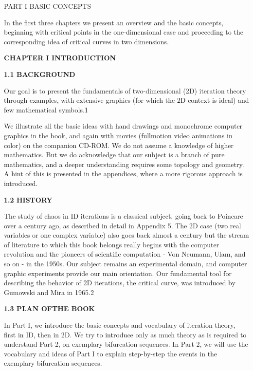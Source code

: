 \documentclass[12pt]{article}
\begin{document}
PART I
BASIC
CONCEPTS

\hfill

In the first three chapters we present an overview
and the basic concepts, beginning with critical
points in the one-dimensional case and proceeding
to the corresponding idea of critical curves in two
dimensions.

\hfill

\textbf{CHAPTER I
INTRODUCTION}

\hfill

\textbf{1.1 BACKGROUND}

\hfill

Our goal is to present the fundamentals of two-dimensional
(2D) iteration theory through examples, with extensive graphics
(for which the 2D context is ideal) and few mathematical symbols.1

\hfill

We illustrate all the basic ideas with hand drawings and monochrome
computer graphics in the book, and again with movies (fullmotion
video animations in color) on the companion CD-ROM.
We do not assume a knowledge of higher mathematics. But we
do acknowledge that our subject is a branch of pure mathematics,
and a deeper understanding requires some topology and geometry.
A hint of this is presented in the appendices, where a more rigorous
approach is introduced.

\hfill

\textbf{1.2 HISTORY}

\hfill

The study of chaos in ID iterations is a classical subject, going
back to Poincare over a century ago, as described in detail in
Appendix 5. The 2D case (two real variables or one complex variable)
also goes back almost a century but the stream of literature to
which this book belongs really begins with the computer revolution
and the pioneers of scientific computation - Von Neumann, Ulam,
and so on - in the 1950s. Our subject remains an experimental
domain, and computer graphic experiments provide our main orientation.
Our fundamental tool for describing the behavior of 2D
iterations, the critical curve, was introduced by Gumowski and
Mira in 1965.2

\hfill

\textbf{1.3 PLAN OFTHE BOOK}

\hfill

In Part I, we introduce the basic concepts and vocabulary of
iteration theory, first in ID, then in 2D. We try to introduce only as
much theory as is required to understand Part 2, on exemplary
bifurcation sequences. In Part 2, we will use the vocabulary and
ideas of Part I to explain step-by-step the events in the exemplary
bifurcation sequences.
\end{document}
